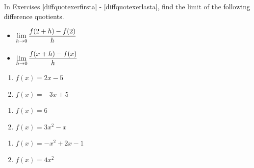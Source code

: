 \documentclass{ximera}
\begin{document}
	\author{Stitz-Zeager}


\label{ExercisesforAppDerivatives}
In Exercises \ref{diffquotexerfirsta} - \ref{diffquotexerlasta}, find the limit of the following difference quotients.

\begin{multicols}{2}

\begin{itemize}

\item  $\ds{\lim_{h \rightarrow 0} \dfrac{f(2+h) - f(2)}{h}}$

\item  $\ds{\lim_{h \rightarrow 0} \dfrac{f(x+h) - f(x)}{h}}$

\end{itemize}

\end{multicols}


\begin{multicols}{2}

\begin{enumerate}


\item $f(x) = 2x - 5$ \label{diffquotexerfirsta}
\item $f(x) = -3x + 5$

\setcounter{HW}{\value{enumi}}
\end{enumerate}
\end{multicols}

\begin{multicols}{2}
\begin{enumerate}
\setcounter{enumi}{\value{HW}}

\item $f(x) = 6$
\item $f(x) = 3x^2 - x$

\setcounter{HW}{\value{enumi}}
\end{enumerate}
\end{multicols}

\begin{multicols}{2}
\begin{enumerate}
\setcounter{enumi}{\value{HW}}

\item $f(x) = -x^2 + 2x - 1$
\item\label{diffquotexerlasta}  $f(x) = 4x^2$ 

\setcounter{HW}{\value{enumi}}
\end{enumerate}
\end{multicols}
\end{document}
